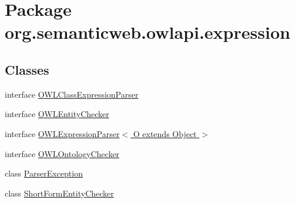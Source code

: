 \hypertarget{namespaceorg_1_1semanticweb_1_1owlapi_1_1expression}{\section{Package org.\-semanticweb.\-owlapi.\-expression}
\label{namespaceorg_1_1semanticweb_1_1owlapi_1_1expression}
}
\subsection*{Classes}
\begin{DoxyCompactItemize}
\item 
interface \hyperlink{interfaceorg_1_1semanticweb_1_1owlapi_1_1expression_1_1_o_w_l_class_expression_parser}{O\-W\-L\-Class\-Expression\-Parser}
\item 
interface \hyperlink{interfaceorg_1_1semanticweb_1_1owlapi_1_1expression_1_1_o_w_l_entity_checker}{O\-W\-L\-Entity\-Checker}
\item 
interface \hyperlink{interfaceorg_1_1semanticweb_1_1owlapi_1_1expression_1_1_o_w_l_expression_parser_3_01_o_01extends_01_object_01_4}{O\-W\-L\-Expression\-Parser$<$ O extends Object $>$}
\item 
interface \hyperlink{interfaceorg_1_1semanticweb_1_1owlapi_1_1expression_1_1_o_w_l_ontology_checker}{O\-W\-L\-Ontology\-Checker}
\item 
class \hyperlink{classorg_1_1semanticweb_1_1owlapi_1_1expression_1_1_parser_exception}{Parser\-Exception}
\item 
class \hyperlink{classorg_1_1semanticweb_1_1owlapi_1_1expression_1_1_short_form_entity_checker}{Short\-Form\-Entity\-Checker}
\end{DoxyCompactItemize}
